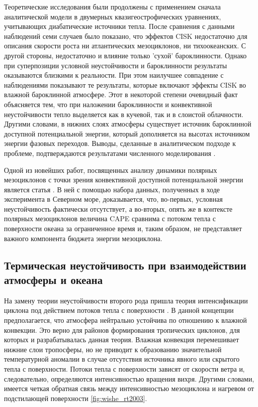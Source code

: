 Теоретические исследования были продолжены с применением сначала аналитической модели \citep{SardieWarner1983} в двумерных квазигеострофических уравнениях, учитывающих диабатические источники тепла. После сравнения с данными наблюдений семи случаев было показано, что эффектов CISK недостаточно для описания скорости роста ни атлантических мезоциклонов, ни тихоокеанских. С другой стороны, недостаточно и влияние только 'сухой' бароклинности. Однако при суперпозиции условной неустойчивости и бароклинности результаты оказываются близкими к реальности. При этом наилучшее совпадение с наблюдениями показывают те результаты, которые включают эффекты CISK во влажной бароклинной атмосфере. Этот в некоторой степени очевидный факт объясняется тем, что при наложении бароклинности и конвективной неустойчивости тепло выделяется как в кучевой, так и в слоистой облачности. Другими словами, в нижних слоях атмосферы существует источник бароклинной доступной потенциальной энергии, который дополняется на высотах источником энергии фазовых переходов. Выводы, сделанные в аналитическом подходе к проблеме, подтверждаются результатами численного моделирования \citep{SardieWarner1983}.

Одной из новейших работ, посвященных анализу динамики полярных мезоциклонов с точки зрения конвективной доступной потенциальной энергии является статья \citep{LindersSaetra2010}. В ней с помощью набора данных, полученных в ходе эксперимента в Северном море, доказывается, что, во-первых, условная неустойчивость фактически отсутствует, а во-вторых, опять же в контексте полярных мезоциклонов величина CAPE сравнима с потоком тепла с поверхности океана за ограниченное время и, таким образом, не представляет важного компонента бюджета энергии мезоциклона.

\subsection{Термическая неустойчивость при взаимодействии атмосферы и океана}
На замену теории неустойчивости второго рода пришла теория интенсификации циклона под действием потоков тепла с поверхности \citep{EmanuelRotunno1989}. В данной концепции предполагается, что атмосфера нейтрально устойчива по отношению к влажной конвекции. Это верно для районов формирования тропических циклонов, для которых и разрабатывалась данная теория. Влажная конвекция перемешивает нижние слои тропосферы, но не приводит к образованию значительной температурной аномалии в случае отсутствия источника явного или скрытого тепла с поверхности. Потоки тепла с поверхности зависят от скорости ветра и, следовательно, определяются интенсивностью вращения вихря. Другими словами, имеется четкая обратная связь между интенсивностью мезоциклона и нагревом от подстилающей поверхности \ref{fig:wishe_rt2003}.

